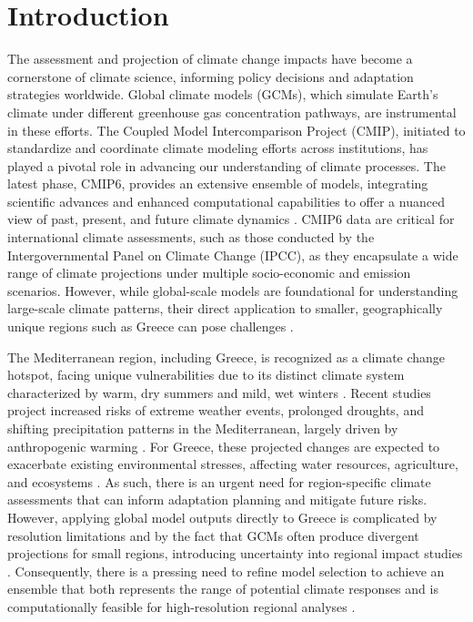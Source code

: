 \documentclass[pdflatex,sn-chicago]{sn-jnl}%
\theoremstyle{thmstyleone}%
\theoremstyle{thmstyletwo}%
\theoremstyle{thmstylethree}%
\begin{document}
\section{Introduction}\label{sec1}
The assessment and projection of climate change impacts have become a cornerstone of climate science, informing policy decisions and adaptation strategies worldwide. Global climate models (GCMs), which simulate Earth’s climate under different greenhouse gas concentration pathways, are instrumental in these efforts. The Coupled Model Intercomparison Project (CMIP), initiated to standardize and coordinate climate modeling efforts across institutions, has played a pivotal role in advancing our understanding of climate processes. The latest phase, CMIP6, provides an extensive ensemble of models, integrating scientific advances and enhanced computational capabilities to offer a nuanced view of past, present, and future climate dynamics \citep{Seker2022, Coppola2020}. CMIP6 data are critical for international climate assessments, such as those conducted by the Intergovernmental Panel on Climate Change (IPCC), as they encapsulate a wide range of climate projections under multiple socio-economic and emission scenarios. However, while global-scale models are foundational for understanding large-scale climate patterns, their direct application to smaller, geographically unique regions such as Greece can pose challenges \citep{Arjdal2023, Ezzaher2023}.

The Mediterranean region, including Greece, is recognized as a climate change hotspot, facing unique vulnerabilities due to its distinct climate system characterized by warm, dry summers and mild, wet winters \citep{Coppola2020, Lionello2012}. Recent studies project increased risks of extreme weather events, prolonged droughts, and shifting precipitation patterns in the Mediterranean, largely driven by anthropogenic warming \citep{Mesta2021, Todaro2022}. For Greece, these projected changes are expected to exacerbate existing environmental stresses, affecting water resources, agriculture, and ecosystems \citep{Katopodis2021, Giuntoli2020}. As such, there is an urgent need for region-specific climate assessments that can inform adaptation planning and mitigate future risks. However, applying global model outputs directly to Greece is complicated by resolution limitations and by the fact that GCMs often produce divergent projections for small regions, introducing uncertainty into regional impact studies \citep{Conte2020, Arjdal2023}. Consequently, there is a pressing need to refine model selection to achieve an ensemble that both represents the range of potential climate responses and is computationally feasible for high-resolution regional analyses \citep{Seker2022, Kim2020}.
\end{document}
